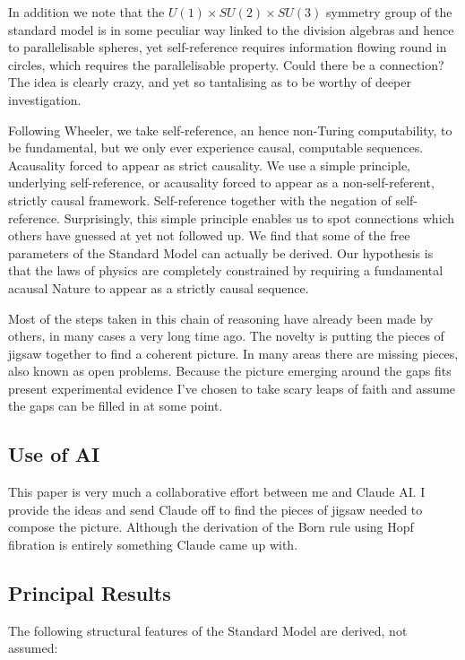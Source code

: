 \documentclass{article}
\begin{document}
In addition we note that the $U(1) \times SU(2) \times SU(3)$ symmetry group of the standard model is in some peculiar way linked to the division algebras and hence to parallelisable spheres, yet self-reference requires information flowing round in circles, which requires the parallelisable property. Could there be a connection? The idea is clearly crazy, and yet so tantalising as to be worthy of deeper investigation.

Following Wheeler, we take self-reference, an hence non-Turing computability, to be fundamental, but we only ever experience causal, computable sequences. Acausality forced to appear as strict causality. We use a simple principle, underlying self-reference, or acausality forced to appear as a non-self-referent, strictly causal framework. Self-reference together with the negation of self-reference. Surprisingly, this simple principle enables us to spot connections which others have guessed at yet not followed up. We find that some of the free parameters of the Standard Model can actually be derived. Our hypothesis is that the laws of physics are completely constrained by requiring a fundamental acausal Nature to appear as a strictly causal sequence. 

Most of the steps taken in this chain of reasoning have already been made by others, in many cases a very long time ago. The novelty is putting the pieces of jigsaw together to find a coherent picture. In many areas there are missing pieces, also known as open problems. Because the picture emerging around the gaps fits present experimental evidence I've chosen to take scary leaps of faith and assume the gaps can be filled in at some point. 

\subsection{Use of AI}
This paper is very much a collaborative effort between me and Claude AI. I provide the ideas and send Claude off to find the pieces of jigsaw needed to compose the picture. Although the derivation of the Born rule using Hopf fibration is entirely something Claude came up with.

\subsection{Principal Results}
The following structural features of the Standard Model are derived, not assumed:
\end{document}
